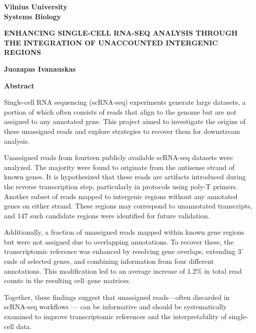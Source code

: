 \begin{center}
    \textbf{Vilnius University} \\
    \textbf{Systems Biology} \\
    
    \vspace{0.5cm}
    
    \textbf{ENHANCING SINGLE-CELL RNA-SEQ ANALYSIS THROUGH THE INTEGRATION OF UNACCOUNTED INTERGENIC REGIONS} \\
    
    \vspace{1cm}
    
    \textbf{Juozapas Ivanauskas} \\
    
    \vspace{1cm}
    
    \textbf{Abstract} \\
    
\end{center}

Single-cell RNA sequencing (scRNA-seq) experiments generate large datasets,
a portion of which often consists of reads that align to the genome but are not assigned to any annotated gene.
This project aimed to investigate the origins of these unassigned reads and explore strategies to recover them for downstream analysis.

Unassigned reads from fourteen publicly available scRNA-seq datasets were analyzed.
The majority were found to originate from the antisense strand of known genes.
It is hypothesized that these reads are artifacts introduced during the reverse transcription step, particularly in protocols using poly-T primers.
Another subset of reads mapped to intergenic regions without any annotated genes on either strand.
These regions may correspond to unannotated transcripts, and 147 such candidate regions were identified for future validation.

Additionally, a fraction of unassigned reads mapped within known gene regions but were not assigned due to overlapping annotations.
To recover these, the transcriptomic reference was enhanced by resolving gene overlaps,
extending 3' ends of selected genes, and combining information from four different annotations.
This modification led to an average increase of 1.2\% in total read counts in the resulting cell–gene matrices.

Together, these findings suggest that unassigned reads—often discarded in scRNA-seq workflows — 
can be informative and should be systematically examined to improve transcriptomic references and the interpretability of single-cell data.

